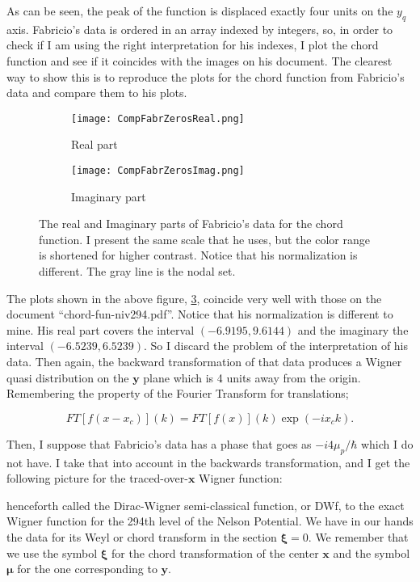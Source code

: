 \documentclass[a4paper,12pt]{article}
\newcommand{\xfase}{\mathbf{x}}
\newcommand{\yfase}{\mathbf{y}}
\newcommand{\xifase}{ {\boldsymbol{\xi}} }
\newcommand{\mufase}{ {\boldsymbol{\mu}} }
\begin{document}
As can be seen, the peak of the function is displaced exactly four 
units on the $y_q$ axis. Fabricio's data is ordered in an array indexed
by integers, so, in order to check if I am using the right interpretation
for his indexes, I plot the chord function and see if it coincides with
the images on his document. The clearest way to show this is to reproduce
the plots for the chord function from Fabricio's data and compare them
to his plots. 

\begin{figure}[H]
  \centering
  \begin{subfigure}[b]{0.45\textwidth}
    \centering
          \texttt{[image: CompFabrZerosReal.png]}
                \caption{Real part}
                \label{realFchord}
  \end{subfigure}%
\begin{subfigure}[b]{0.45\textwidth}
    \centering
          \texttt{[image: CompFabrZerosImag.png]}
                \caption{Imaginary part}
                \label{imagFchord}
  \end{subfigure}%
\caption{The real and Imaginary parts of Fabricio's data for the chord
function. I present the same scale that he uses, but the color range is
shortened for higher contrast. Notice that his normalization is different.  
The gray line is the nodal set. }\label{Fabchords}
\end{figure}

The plots shown in the above figure, \ref{Fabchords}, coincide very well
with those on the document ``chord-fun-niv294.pdf''. Notice that his
normalization is different to mine. His real part covers the interval
$(-6.9195,9.6144)$ and the imaginary the interval
$(-6.5239,6.5239)$. So I discard the problem of the interpretation of
his data. Then again, the backward transformation of that data
produces a Wigner quasi distribution on the $\yfase$ plane which is
4 units away from the origin. Remembering the property of
the Fourier Transform for translations;

\begin{equation}
FT[f(x-x_c)](k)= FT[f(x)](k) \exp(-ix_ck).
\end{equation}

Then, I suppose that Fabricio's data has a phase that goes as
$-i4\mu_p/\hbar$ which I do not have. I take that into account in the
backwards transformation, and I get the following picture for
the traced-over-$\xfase$ Wigner function: 


henceforth called the Dirac-Wigner semi-classical function, or DWf, to the exact
Wigner function for the 294th level of the Nelson Potential. We have
in our hands the data for its Weyl or chord transform in the section
$\xifase=0$. We remember that we use the symbol $\xifase$ for the
chord transformation of the center $\xfase$ and the symbol $\mufase$
for the one corresponding to $\yfase$. 
\end{document}
